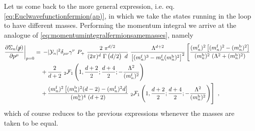 Let us come back to the more general expression, i.e. eq. \eqref{eq:Euclwavefunctionfermion(ap)}, in which we take the states running in the loop to have different masses. Performing the momentum integral we arrive at the analogue of \eqref{eq:momentumintegralfermionsamemasses}, namely
%
\begin{equation}
			\begin{aligned}
				\frac{\partial \Sigma_n(\slashed{p})}{\partial p^{\mu}} \bigg\rvert_{p=0} &= \, -|\mathcal{Y}_n|^2 \delta_{\mu \nu} \gamma^{\nu}\ P_{+}\  \frac{2\ \pi^{d/2}}{(2 \pi)^d\ \Gamma\left( d/2 \right)\ d} \ \frac{\Lambda^{d+2}}{\left[ (m_n^{{\text{f}}})^3 -m_n^{{\text{f}}} (m_n^{{\text{b}}})^2 \right]^2} \left[  \frac{(m_n^{{\text{f}}})^2\left[(m_n^{{\text{f}}})^2 - (m_n^{{\text{b}}})^2 \right]}{(m_n^{{\text{b}}})^2\ (\Lambda^2+(m_n^{{\text{b}}})^2)} \right.  \\
				& \quad \left.  +\, \dfrac{2}{d+2} \ _2{\cal F}_1\left( 1,\frac{d+2}{2};\frac{d+4}{2}; -\frac{\Lambda^2}{(m_n^{{\text{f}}})^2}\right) \right.  \\
				& \quad \left.  +\, \dfrac{(m_n^{{\text{f}}})^2\left[(m_n^{{\text{b}}})^2(d-2) - (m_n^{{\text{f}}})^2 d\right]}{(m_n^{{\text{b}}})^4\ (d+2)} \ _2{\cal F}_1\left( 1,\frac{d+2}{2};\frac{d+4}{2}; -\frac{\Lambda^2}{(m_n^{{\text{b}}})^2}\right) \right] \ ,
			\end{aligned}
\label{eq:momentumintegralfermiondiffmasses(ap)}
\end{equation}
%
which of course reduces to the previous expressions whenever the masses are taken to be equal.

